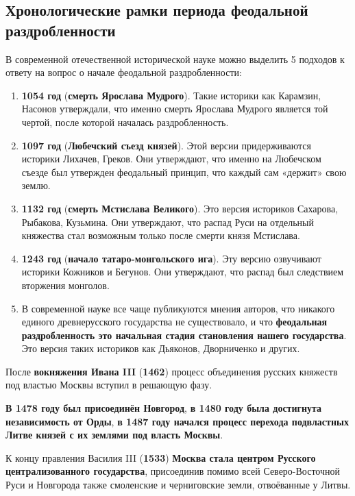 \documentclass{article}
\begin{document}
\subsection{Хронологические рамки периода феодальной раздробленности}

В современной отечественной исторической науке можно выделить 5 подходов к ответу на вопрос о начале феодальной раздробленности:

\begin{enumerate}
    \item \textbf{1054 год} (\textbf{смерть Ярослава Мудрого}). Такие историки как Карамзин, Насонов утверждали, что именно смерть Ярослава Мудрого является той чертой, после которой началась раздробленность.
    \item \textbf{1097 год} (\textbf{Любечский съезд князей}). Этой версии придерживаются историки Лихачев, Греков. Они утверждают, что именно на Любечском съезде был утвержден феодальный принцип, что каждый сам «держит» свою землю.
    \item \textbf{1132 год} (\textbf{смерть Мстислава Великого}). Это версия историков Сахарова, Рыбакова, Кузьмина. Они утверждают, что распад Руси на отдельный княжества стал возможным только после смерти князя Мстислава.
    \item \textbf{1243 год} (\textbf{начало татаро-монгольского ига}). Эту версию озвучивают историки Кожников и Бегунов. Они утверждают, что распад был следствием вторжения монголов.
    \item В современной науке все чаще публикуются мнения авторов, что никакого единого древнерусского государства не существовало, и что \textbf{феодальная раздробленность это начальная стадия становления нашего государства}. Это версия таких историков как Дьяконов, Дворниченко и других.
\end{enumerate}

После \textbf{вокняжения Ивана III} (\textbf{1462}) процесс объединения русских княжеств под властью Москвы вступил в решающую фазу.

\textbf{В 1478 году был присоединён Новгород}, \textbf{в 1480 году была достигнута независимость от Орды}, \textbf{в 1487 году начался процесс перехода подвластных Литве князей с их землями под власть Москвы}.

К концу правления Василия III (\textbf{1533}) \textbf{Москва стала центром Русского централизованного государства}, присоединив помимо всей Северо-Восточной Руси и Новгорода также смоленские и черниговские земли, отвоёванные у Литвы.
\end{document}
